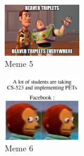 \documentclass[10pt,conference]{IEEEtran}
\begin{document}
\begin{figure}[h]
  \caption{Meme 5}
  \includegraphics[width=0.3\textwidth]{pets_meme_5.jpg}
\end{figure}
\begin{figure}[h]
  \caption{Meme 6}
  \includegraphics[width=0.3\textwidth]{pets_meme_6.jpg}
\end{figure}
\end{document}
